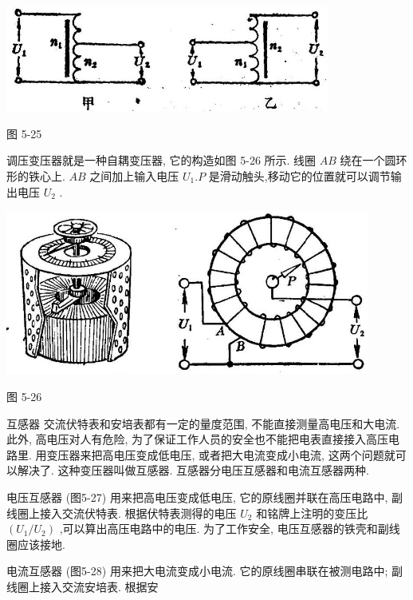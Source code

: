 \documentclass[10pt]{article}
\begin{document}
\begin{center}
\includegraphics[max width=0.8\textwidth]{images/01913056-1f15-74d8-9184-9aab52c9d66b_182_834172.jpg}
\end{center}

图 5-25

调压变压器就是一种自耦变压器, 它的构造如图 5-26 所示. 线圈 \({AB}\) 绕在一个圆环形的铁心上. \({AB}\) 之间加上输入电压 \({U}_{1}.P\) 是滑动触头,移动它的位置就可以调节输出电压 \({U}_{2}\) .

\begin{center}
\includegraphics[max width=0.9\textwidth]{images/01913056-1f15-74d8-9184-9aab52c9d66b_183_858200.jpg}
\end{center}

图 5-26

互感器 交流伏特表和安培表都有一定的量度范围, 不能直接测量高电压和大电流. 此外, 高电压对人有危险, 为了保证工作人员的安全也不能把电表直接接入高压电路里. 用变压器来把高电压变成低电压, 或者把大电流变成小电流, 这两个问题就可以解决了. 这种变压器叫做互感器. 互感器分电压互感器和电流互感器两种.

电压互感器 (图5-27) 用来把高电压变成低电压, 它的原线圈并联在高压电路中, 副线圈上接入交流伏特表. 根据伏特表测得的电压 \({U}_{2}\) 和铭牌上注明的变压比 \(\left( {{U}_{1}/{U}_{2}}\right)\) ,可以算出高压电路中的电压. 为了工作安全, 电压互感器的铁壳和副线圈应该接地.

电流互感器 (图5-28) 用来把大电流变成小电流. 它的原线圈串联在被测电路中; 副线圈上接入交流安培表. 根据安
\end{document}
